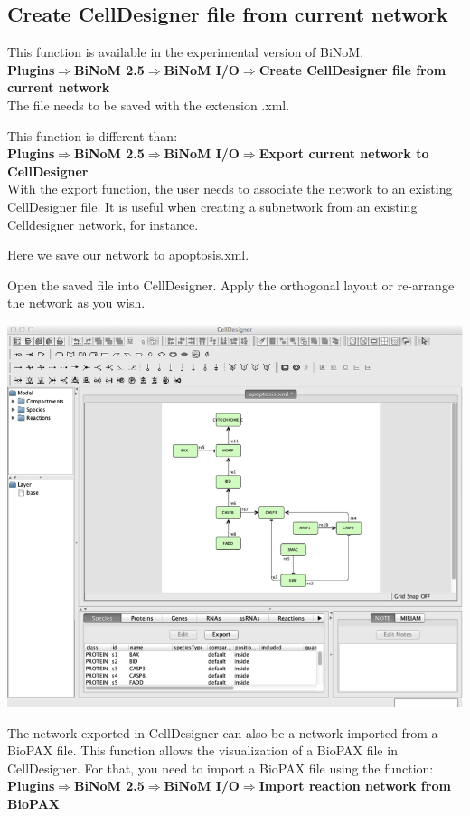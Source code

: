 \subsection{Create CellDesigner file from current network}
This function is available in the experimental version of BiNoM. \\
\textbf{Plugins$\Rightarrow$BiNoM 2.5$\Rightarrow$BiNoM I/O$\Rightarrow$Create CellDesigner file from current network}\\

The file needs to be saved with the extension .xml.

This function is different than:\\
\textbf{Plugins$\Rightarrow$BiNoM 2.5$\Rightarrow$BiNoM I/O$\Rightarrow$Export current network to CellDesigner}\\
With the export function, the user needs to associate the network to an existing CellDesigner file. It is useful when creating a subnetwork from an existing Celldesigner network, for instance.

Here we save our network to apoptosis.xml.

Open the saved file into CellDesigner. Apply the orthogonal layout or re-arrange the network as you wish.


\includegraphics{graphics/Import_CD_brff.png} 

The network exported in CellDesigner can also be a network imported from a BioPAX file. This function allows the visualization of a BioPAX file in CellDesigner.  For that, you need to import a BioPAX file using the function:\\
\textbf{Plugins$\Rightarrow$BiNoM 2.5$\Rightarrow$BiNoM I/O$\Rightarrow$Import reaction network from BioPAX}\\

